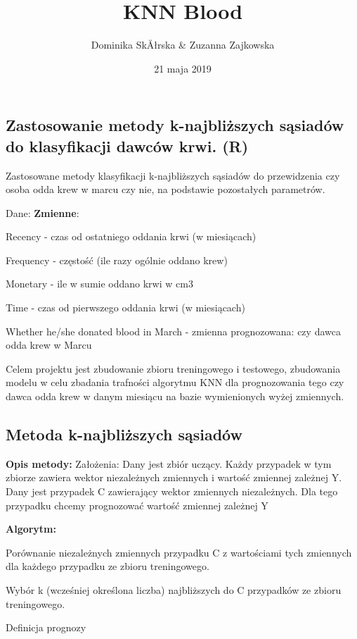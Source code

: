 \documentclass[]{article}
\title{KNN Blood}
\author{Dominika SkĂłrska \& Zuzanna Zajkowska}
\date{21 maja 2019}
\begin{document}
\maketitle

\subsection{Zastosowanie metody k-najbliższych sąsiadów do klasyfikacji
dawców krwi.
(R)}\label{zastosowanie-metody-k-najblizszych-sasiadow-do-klasyfikacji-dawcow-krwi.-r}

Zastosowane metody klasyfikacji k-najbliższych sąsiadów do przewidzenia
czy osoba odda krew w marcu czy nie, na podstawie pozostałych
parametrów.

Dane: \textbf{Zmienne}:

Recency - czas od ostatniego oddania krwi (w miesiącach)

Frequency - częstość (ile razy ogólnie oddano krew)

Monetary - ile w sumie oddano krwi w cm3

Time - czas od pierwszego oddania krwi (w miesiącach)

Whether he/she donated blood in March - zmienna prognozowana: czy dawca
odda krew w Marcu

Celem projektu jest zbudowanie zbioru treningowego i testowego,
zbudowania modelu w celu zbadania trafności algorytmu KNN dla
prognozowania tego czy dawca odda krew w danym miesiącu na bazie
wymienionych wyżej zmiennych.

\subsection{Metoda k-najbliższych
sąsiadów}\label{metoda-k-najblizszych-sasiadow}

\textbf{Opis metody:} Założenia: Dany jest zbiór uczący. Każdy przypadek
w tym zbiorze zawiera wektor niezależnych zmiennych i wartość zmiennej
zależnej Y. Dany jest przypadek C zawierający wektor zmiennych
niezależnych. Dla tego przypadku chcemy prognozować wartość zmiennej
zależnej Y

\textbf{Algorytm: }

Porównanie niezależnych zmiennych przypadku C z wartościami tych
zmiennych dla każdego przypadku ze zbioru treningowego.

Wybór k (wcześniej określona liczba) najbliższych do C przypadków ze
zbioru treningowego.

Definicja prognozy
\end{document}
